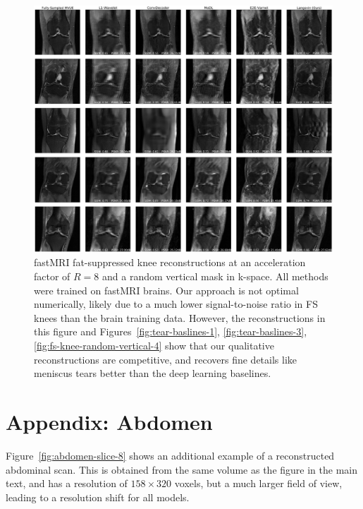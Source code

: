 \documentclass{article}
\newcounter{example}[section]
\begin{document}
\begin{figure}
    \centering
    \includegraphics[width=\columnwidth]{fs-random-vertical-R=8-comp.pdf}
    \caption{\small fastMRI fat-suppressed knee reconstructions at an acceleration factor of $R=8$ and a random vertical mask in k-space. All methods were trained on fastMRI brains. Our approach is not optimal numerically, likely due to a much lower signal-to-noise ratio in FS knees than the brain training data. However, the reconstructions in this figure and Figures~\ref{fig:tear-baslines-1}, \ref{fig:tear-baslines-3}, \ref{fig:fs-knee-random-vertical-4} show that our qualitative reconstructions are competitive, and recovers fine details like meniscus tears better than the deep learning baselines.}
    \label{fig:fs-knee-random-vertical-8}
\end{figure}




\clearpage

\section{Appendix: Abdomen}\label{app:abdomens}
Figure~\ref{fig:abdomen-slice-8} shows an additional example of a reconstructed abdominal scan. This is obtained from the same volume as the figure in the main text, and has a resolution of $158 \times 320$ voxels, but a much larger field of view, leading to a resolution shift for all models.
\end{document}
